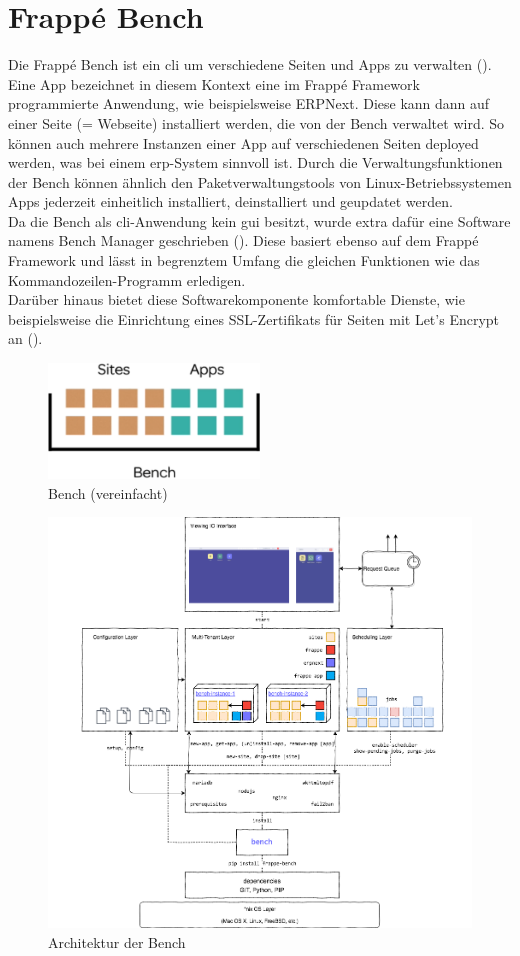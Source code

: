 \section{Frappé Bench}
Die Frappé Bench ist ein \gls{cli} um verschiedene Seiten und Apps zu verwalten (\vgl \cite{GhBench}). 
Eine App bezeichnet in diesem Kontext eine im Frappé Framework programmierte Anwendung, wie beispielsweise ERPNext. Diese kann dann auf einer Seite (= Webseite) installiert werden, die von der Bench verwaltet wird. So können auch mehrere Instanzen einer App auf verschiedenen Seiten deployed werden, was bei einem \gls{erp}-System sinnvoll ist. Durch die Verwaltungsfunktionen der Bench können ähnlich den Paketverwaltungstools von Linux-Betriebssystemen Apps jederzeit einheitlich installiert, deinstalliert und geupdatet werden.\\
Da die Bench als \gls{cli}-Anwendung kein \gls{gui} besitzt, wurde extra dafür eine Software namens Bench Manager geschrieben (\vgl \cite{GhBenchManager}). Diese basiert ebenso auf dem Frappé Framework und lässt in begrenztem Umfang die gleichen Funktionen wie das Kommandozeilen-Programm erledigen. \\
Darüber hinaus bietet diese Softwarekomponente komfortable Dienste, wie beispielsweise die Einrichtung eines SSL-Zertifikats für Seiten mit Let's Encrypt an (\vgl \cite{GhBenchSsl}).
\begin{figure}
  \centering
  \includegraphics[width=0.5\textwidth]{Bilder/Bench_vereinfacht.png}
  \caption{Bench (vereinfacht)}
  \label{fig:benchVereinfacht}
\end{figure}
\begin{figure}
  \centering
  \includegraphics[width=\textwidth]{Bilder/Bench.png}
  \caption{Architektur der Bench}
  \label{fig:bench}
\end{figure}